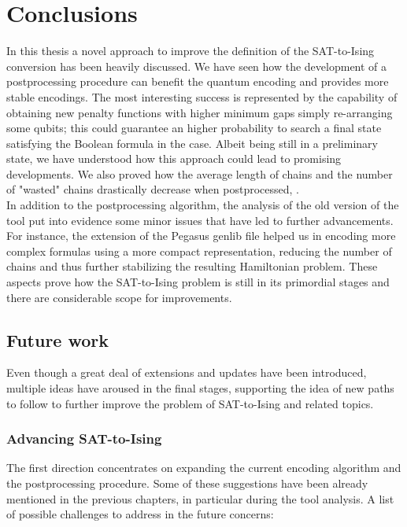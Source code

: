 \chapter{Conclusions}
\label{cha:conclusioni}

In this thesis a novel approach to improve the definition of the SAT-to-Ising conversion has been heavily discussed. We have seen how the development of a postprocessing procedure can benefit the quantum encoding and provides more stable encodings. The most interesting success is represented by the capability of obtaining new penalty functions with higher minimum gaps simply re-arranging some qubits; this could guarantee an higher probability to search a final state satisfying the Boolean formula in the case. Albeit being still in a preliminary state, we have understood how this approach could lead to promising developments. We also proved how the average length of chains and the number of "wasted" chains drastically decrease when postprocessed, . \\
In addition to the postprocessing algorithm, the analysis of the old version of the tool put into evidence some minor issues that have led to further advancements. For instance, the extension of the Pegasus genlib file helped us in encoding more complex formulas using a more compact representation, reducing the number of chains and thus further stabilizing the resulting Hamiltonian problem. These aspects prove how the SAT-to-Ising problem is still in its primordial stages and there are considerable scope for improvements.

\section{Future work}

Even though a great deal of extensions and updates have been introduced, multiple ideas have aroused in the final stages, supporting the idea of new paths to follow to further improve the problem of SAT-to-Ising and related topics.

\subsection{Advancing SAT-to-Ising}

The first direction concentrates on expanding the current encoding algorithm and the postprocessing procedure. Some of these suggestions have been already mentioned in the previous chapters, in particular during the tool analysis. A list of possible challenges to address in the future concerns:

